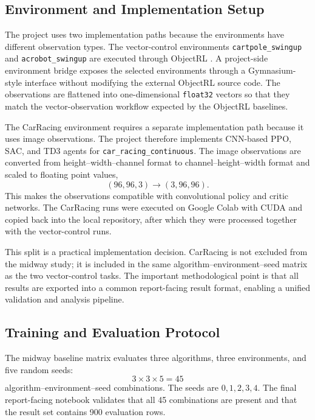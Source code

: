 \subsection{Environment and Implementation Setup}
\label{sec:methodology-implementation}

The project uses two implementation paths because the environments have different observation types. The vector-control environments \texttt{cartpole\_swingup} and \texttt{acrobot\_swingup} are executed through ObjectRL \citep{baykal2025objectrl}. A project-side environment bridge exposes the selected environments through a Gymnasium-style interface without modifying the external ObjectRL source code. The observations are flattened into one-dimensional \texttt{float32} vectors so that they match the vector-observation workflow expected by the ObjectRL baselines.

The CarRacing environment requires a separate implementation path because it uses image observations. The project therefore implements CNN-based PPO, SAC, and TD3 agents for \texttt{car\_racing\_continuous}. The image observations are converted from height--width--channel format to channel--height--width format and scaled to floating point values,
\[
(96,96,3) \rightarrow (3,96,96).
\]
This makes the observations compatible with convolutional policy and critic networks. The CarRacing runs were executed on Google Colab with CUDA and copied back into the local repository, after which they were processed together with the vector-control runs.

This split is a practical implementation decision. CarRacing is not excluded from the midway study; it is included in the same algorithm--environment--seed matrix as the two vector-control tasks. The important methodological point is that all results are exported into a common report-facing result format, enabling a unified validation and analysis pipeline.

\subsection{Training and Evaluation Protocol}
\label{sec:methodology-protocol}

The midway baseline matrix evaluates three algorithms, three environments, and five random seeds:
\[
3 \times 3 \times 5 = 45
\]
algorithm--environment--seed combinations. The seeds are $0,1,2,3,4$. The final report-facing notebook validates that all 45 combinations are present and that the result set contains 900 evaluation rows.

